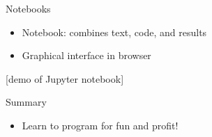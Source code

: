 \documentclass{beamer}
\begin{document}
\begin{frame}{Notebooks}
    \begin{itemize}
    \item Notebook: combines text, code, and results
    \item Graphical interface in browser
    \end{itemize}

    [demo of Jupyter notebook]
\end{frame}

\begin{frame}{Summary}
	\begin{itemize}
		\item Learn to program for fun and profit!
	\end{itemize}
\end{frame}
\end{document}
